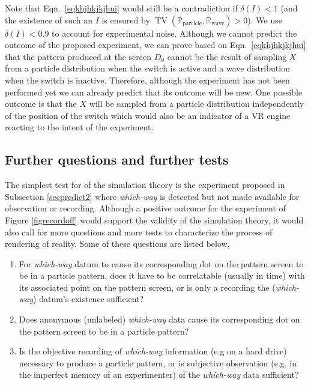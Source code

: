 \documentclass[11pt]{article}
\renewcommand{\P}{\mathbb{P}}
\newcommand{\pa}{\text{particle}}
\newcommand{\wa}{\text{wave}}
\theoremstyle{definition}
\begin{document}
Note that Eqn.~\eqref{eqkhjhkjkjhui} would still be a contradiction if $\delta(I)<1$ (and the existence of such an $I$ is ensured by $\operatorname{TV}(\P_\pa,\P_\wa)>0$). We use $\delta(I)<0.9$ to account for experimental noise. Although we cannot predict the outcome of the proposed experiment, we can prove based on Eqn.~\eqref{eqkhjhkjkjhui} that the pattern produced at the screen $D_0$ cannot be the result of sampling $X$ from a particle distribution when the switch is active and a wave distribution when the switch is inactive. Therefore, although the experiment has not been performed yet we can already predict that its outcome will be new. One possible outcome is that the $X$ will be sampled from a particle distribution independently of the position of the switch which would also be an indicator of a VR engine reacting to the intent of the experiment.

\subsection{Further questions and further tests}
The simplest test for of the simulation theory is the experiment proposed in Subsection \ref{secpredict2} where \emph{which-way} is detected but not made available for observation or recording.
 Although a positive outcome for the experiment of Figure \ref{figrecordoff} would support the validity of the simulation theory,  it would also call for more questions and more tests to characterize the process of rendering of reality.
Some of these questions are listed below,
\begin{enumerate}
\item For \emph{which-way} datum  to cause its corresponding dot on the pattern screen to be in a particle pattern, does it have to be correlatable (usually in time) with its associated  point on the  pattern screen, or is only a recording the (\emph{which-way}) datum’s existence sufficient?
\item	Does anonymous (unlabeled) \emph{which-way} data cause its corresponding dot on the pattern screen to be in a particle pattern?
\item	Is the objective recording of \emph{which-way} information (e.g on a hard drive) necessary to  produce a particle pattern, or is subjective observation (e.g. in the imperfect memory of an experimenter) of the \emph{which-way} data sufficient?
\end{enumerate}
\end{document}
